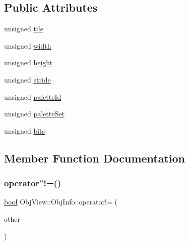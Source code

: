 \subsection*{Public Attributes}
\begin{DoxyCompactItemize}
\item 
unsigned \mbox{\hyperlink{struct_q_g_b_a_1_1_obj_view_1_1_obj_info_ad3f4a637b788e95eebd8eff24ddda6d0}{tile}}
\item 
unsigned \mbox{\hyperlink{struct_q_g_b_a_1_1_obj_view_1_1_obj_info_a7459061dc4ed6c2cc6263b40aaca6794}{width}}
\item 
unsigned \mbox{\hyperlink{struct_q_g_b_a_1_1_obj_view_1_1_obj_info_a0464b71d6423babd52bb2df9783861b3}{height}}
\item 
unsigned \mbox{\hyperlink{struct_q_g_b_a_1_1_obj_view_1_1_obj_info_ab4775d1c3d2cced18f0e820d8b3422cc}{stride}}
\item 
unsigned \mbox{\hyperlink{struct_q_g_b_a_1_1_obj_view_1_1_obj_info_a5c86294ec8cd0cc0346f766409e13e84}{palette\+Id}}
\item 
unsigned \mbox{\hyperlink{struct_q_g_b_a_1_1_obj_view_1_1_obj_info_aea730ef1357c5f7e75ce2026a9d347d3}{palette\+Set}}
\item 
unsigned \mbox{\hyperlink{struct_q_g_b_a_1_1_obj_view_1_1_obj_info_a6ee279d357ec4508eac7be84c419cbc8}{bits}}
\end{DoxyCompactItemize}


\subsection{Member Function Documentation}
\mbox{\label{struct_q_g_b_a_1_1_obj_view_1_1_obj_info_a28af078c745cff5f913d3c8e8c83e5ed}} 
\subsubsection{\texorpdfstring{operator"!=()}{operator!=()}}
{\footnotesize\ttfamily \mbox{\hyperlink{libretro_8h_a4a26dcae73fb7e1528214a068aca317e}{bool}} Obj\+View\+::\+Obj\+Info\+::operator!= (\begin{DoxyParamCaption}\item[{const \mbox{\hyperlink{struct_q_g_b_a_1_1_obj_view_1_1_obj_info}{Obj\+Info}} \&}]{other }\end{DoxyParamCaption})}



